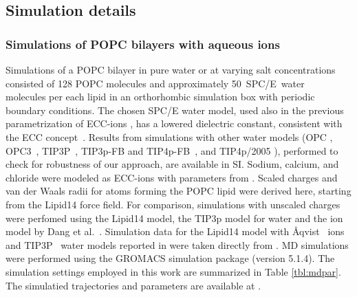 \documentclass[aip,jcp,twocolumn]{revtex4}
\begin{document}
\subsection{Simulation details}

\subsubsection{Simulations of POPC bilayers with aqueous ions}
Simulations of a POPC bilayer in pure water or at varying salt concentrations
consisted of 128 POPC molecules and approximately 50~SPC/E~water~\cite{Berendsen1987} molecules per each lipid
in an orthorhombic simulation box with periodic boundary conditions. 
The chosen SPC/E water model, used also in the previous parametrization of 
ECC-ions \cite{jungwirth17-new-paper-to-be-published, kohagen16, Pluharova2014},
has a lowered dielectric constant, consistent with the ECC concept~\cite{leontyev11, leontyev14}.
Results from simulations with other water models 
(OPC \cite{Izadi14}, OPC3~\cite{Izadi16}, 
TIP3P~\cite{jorgensen83},
TIP3p-FB and TIP4p-FB~\cite{Wang2014},
and TIP4p/2005 \cite{Abascal2005}), performed to check for robustness of our approach, are available in SI.
Sodium, calcium, and chloride 
were modeled as ECC-ions with parameters from .  %
Scaled charges and van der Waals radii for atoms forming the POPC lipid were derived here, starting from the Lipid14 force field.
For comparison, simulations with unscaled charges were perfomed using the Lipid14 model, the TIP3p model for water \cite{jorgensen83} and the ion model by
Dang et al.~\cite{smith94,chang1999,dang2006}.
Simulation data for the Lipid14 model with \AA{}qvist~\cite{aqvist90} ions and TIP3P~\cite{jorgensen83}
water models reported in \cite{catte16} 
were taken directly from \cite{lipid14POPC0mMNaClfiles,lipid14POPC350mMCaClfiles,lipid14POPC350mMCaClfilesNC,lipid14POPC1000mMNaClfiles}. 
MD simulations were performed using the GROMACS \cite{Abraham15} simulation package (version 5.1.4).  
The simulation settings employed in this work are 
summarized in Table \ref{tbl:mdpar}. 
The simulatied trajectories and parameters are available at \cite{??} . 
\end{document}

